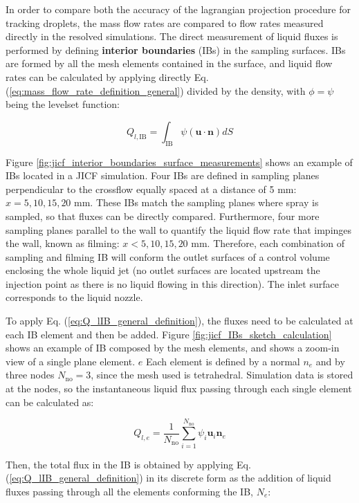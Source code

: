 In order to compare both the accuracy of the lagrangian projection procedure for tracking droplets, the mass flow rates are compared to flow rates measured directly in the resolved simulations. The direct measurement of liquid fluxes is performed by defining \textbf{interior boundaries} (IBs) in the sampling surfaces. IBs are formed by all the mesh elements contained in the surface, and liquid flow rates can be calculated by applying directly Eq. (\ref{eq:mass_flow_rate_definition_general}) divided by the density, with $\phi = \psi$ being the levelset function:

\begin{equation}
\label{eq:Q_lIB_general_definition}
Q_{l,\mathrm{IB}} = \int_{\mathrm{IB}} \psi \left( \textbf{u} \cdot \textbf{n} \right) dS
\end{equation}

Figure \ref{fig:jicf_interior_boundaries_surface_measurements} shows an example of IBs located in a JICF simulation. Four IBs are defined in sampling planes perpendicular to the crossflow equally spaced at a distance of 5 mm: $x = 5, 10, 15, 20$ mm. These IBs match the sampling planes where spray is sampled, so that fluxes can be directly compared. Furthermore, four more sampling planes parallel to the wall to quantify the liquid flow rate that impinges the wall, known as filming: $x <5, 10, 15, 20$ mm. Therefore, each combination of sampling and filming IB will conform the outlet surfaces of a control volume enclosing the whole liquid jet (no outlet surfaces are located upstream the injection point as there is no liquid flowing in this direction). The inlet surface corresponds to the liquid nozzle.



To apply Eq. (\ref{eq:Q_lIB_general_definition}), the fluxes need to be calculated at each IB element and then be added. Figure \ref{fig:jicf_IBs_sketch_calculation} shows an example of IB composed by the mesh elements, and shows a zoom-in view of a single plane element. $e$ Each element is defined by a normal $n_e$ and by three nodes $N_\mathrm{no} = 3$, since the mesh used is tetrahedral. Simulation data is stored at the nodes, so the instantaneous liquid flux passing through each single element can be calculated as:

\begin{equation}
Q_{l,e} = \frac{1}{N_\mathrm{no}} \sum_{i=1}^{N_\mathrm{no}} \psi_i \textbf{u}_i \textbf{n}_e
\end{equation}

Then, the total flux in the IB is obtained by applying Eq. (\ref{eq:Q_lIB_general_definition}) in its discrete form as the addition of liquid fluxes passing through all the elements conforming the IB, $N_e$:

